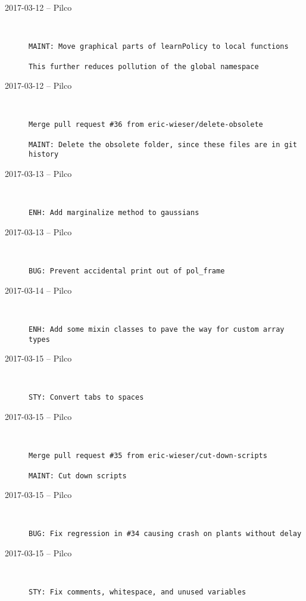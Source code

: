 \begin{description}
  \item[2017-03-12 -- Pilco] \hfill \
\begin{lstlisting}
MAINT: Move graphical parts of learnPolicy to local functions

This further reduces pollution of the global namespace
\end{lstlisting}


  \item[2017-03-12 -- Pilco] \hfill \
\begin{lstlisting}
Merge pull request #36 from eric-wieser/delete-obsolete

MAINT: Delete the obsolete folder, since these files are in git history\end{lstlisting}


  \item[2017-03-13 -- Pilco] \hfill \
\begin{lstlisting}
ENH: Add marginalize method to gaussians
\end{lstlisting}


  \item[2017-03-13 -- Pilco] \hfill \
\begin{lstlisting}
BUG: Prevent accidental print out of pol_frame
\end{lstlisting}


  \item[2017-03-14 -- Pilco] \hfill \
\begin{lstlisting}
ENH: Add some mixin classes to pave the way for custom array types
\end{lstlisting}


  \item[2017-03-15 -- Pilco] \hfill \
\begin{lstlisting}
STY: Convert tabs to spaces
\end{lstlisting}


  \item[2017-03-15 -- Pilco] \hfill \
\begin{lstlisting}
Merge pull request #35 from eric-wieser/cut-down-scripts

MAINT: Cut down scripts\end{lstlisting}


  \item[2017-03-15 -- Pilco] \hfill \
\begin{lstlisting}
BUG: Fix regression in #34 causing crash on plants without delay
\end{lstlisting}


  \item[2017-03-15 -- Pilco] \hfill \
\begin{lstlisting}
STY: Fix comments, whitespace, and unused variables


\end{lstlisting}
\end{description}
